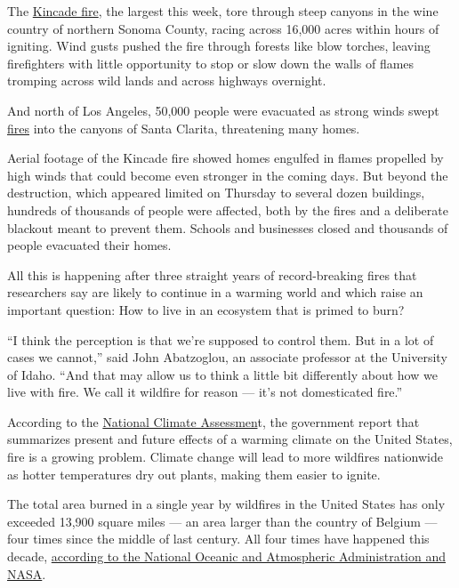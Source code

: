 The
\href{https://www.nytimes3xbfgragh.onion/2019/10/24/us/california-fires-today.html}{Kincade
fire}, the largest this week, tore through steep canyons in the wine
country of northern Sonoma County, racing across 16,000 acres within
hours of igniting. Wind gusts pushed the fire through forests like blow
torches, leaving firefighters with little opportunity to stop or slow
down the walls of flames tromping across wild lands and across highways
overnight.

And north of Los Angeles, 50,000 people were evacuated as strong winds
swept
\href{https://www.nytimes3xbfgragh.onion/2019/10/24/us/california-fires-today.html}{fires}
into the canyons of Santa Clarita, threatening many homes.

Aerial footage of the Kincade fire showed homes engulfed in flames
propelled by high winds that could become even stronger in the coming
days. But beyond the destruction, which appeared limited on Thursday to
several dozen buildings, hundreds of thousands of people were affected,
both by the fires and a deliberate blackout meant to prevent them.
Schools and businesses closed and thousands of people evacuated their
homes.

All this is happening after three straight years of record-breaking
fires that researchers say are likely to continue in a warming world and
which raise an important question: How to live in an ecosystem that is
primed to burn?

``I think the perception is that we're supposed to control them. But in
a lot of cases we cannot,'' said John Abatzoglou, an associate professor
at the University of Idaho. ``And that may allow us to think a little
bit differently about how we live with fire. We call it wildfire for
reason --- it's not domesticated fire.''

According to the
\href{https://www.nytimes3xbfgragh.onion/2018/11/23/climate/us-climate-report.html?module=inline}{National
Climate Assessmen}t, the government report that summarizes present and
future effects of a warming climate on the United States, fire is a
growing problem. Climate change will lead to more wildfires nationwide
as hotter temperatures dry out plants, making them easier to ignite.

The total area burned in a single year by wildfires in the United States
has only exceeded 13,900 square miles --- an area larger than the
country of Belgium --- four times since the middle of last century. All
four times have happened this decade,
\href{https://www.esrl.noaa.gov/csd/projects/firex-aq/whitepaper.pdf}{according
to the National Oceanic and Atmospheric Administration and NASA}.


